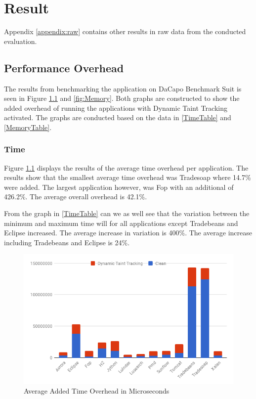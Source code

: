 \chapter{Result}
Appendix \ref{appendix:raw} contains other results in raw data from the conducted evaluation.


\section{Performance Overhead}
The results from benchmarking the application on DaCapo Benchmark Suit \parencite{dacapo} is seen in Figure \ref{fig:Time} and \ref{fig:Memory}. Both graphs are constructed to show the added overhead of running the applications with Dynamic Taint Tracking activated. The graphs are conducted based on the data in \ref{TimeTable} and \ref{MemoryTable}.


\subsection{Time}
Figure \ref{fig:Time} displays the results of the average time overhead per application. The results show that the smallest average time overhead was  Tradesoap where 14.7\% were added. The largest application however, was Fop with an additional of 426.2\%. The average overall overhead is 42.1\%.

From the graph in \ref{TimeTable} can we as well see that the variation between the minimum and maximum time will for all applications except Tradebeans and Eclipse increased. The average increase in variation is 400\%. The average increase including Tradebeans and Eclipse is 24\%.

\begin{figure}[!h]
	\centering
	\includegraphics[width=\textwidth]{images/Time.png}
	\caption{Average Added Time Overhead in Microseconds}
	\label{fig:Time}
\end{figure}


